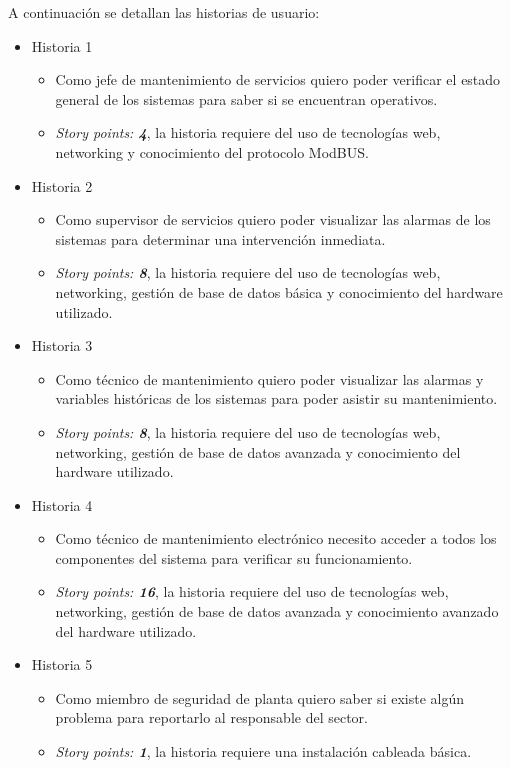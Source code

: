 \documentclass[
11pt%
]{charter}
\begin{document}
A continuación se detallan las historias de usuario:

\begin{itemize}
	\item Historia 1 
\begin{itemize}
	\item Como jefe de mantenimiento de servicios quiero poder verificar el estado general de los sistemas para saber si se encuentran operativos. 
	\item\textit{Story points: \textbf{4}}, la historia requiere del uso de tecnologías web, networking y conocimiento del protocolo ModBUS.
\end{itemize}
	\item Historia 2
\begin{itemize}
	\item Como supervisor de servicios quiero poder visualizar las alarmas de los sistemas para determinar una intervención inmediata.
	\item \textit{Story points: \textbf{8}}, la historia requiere del uso de tecnologías web, networking, gestión de base de datos básica y conocimiento del hardware utilizado.
\end{itemize}
	\item Historia 3
\begin{itemize}
	\item Como técnico de mantenimiento quiero poder visualizar las alarmas y variables históricas de los sistemas para poder asistir su mantenimiento.
	\item \textit{Story points: \textbf{8}}, la historia requiere del uso de tecnologías web, networking, gestión de base de datos avanzada y conocimiento del hardware utilizado.
\end{itemize}
	\item Historia 4
\begin{itemize}
	\item Como técnico de mantenimiento electrónico necesito acceder a todos los componentes del sistema para verificar su funcionamiento.
	\item \textit{Story points: \textbf{16}}, la historia requiere del uso de tecnologías web, networking, gestión de base de datos avanzada y conocimiento avanzado del hardware utilizado.
\end{itemize}
	\item Historia 5
\begin{itemize}
	\item Como miembro de seguridad de planta quiero saber si existe algún problema para reportarlo al responsable del sector.
	\item \textit{Story points: \textbf{1}}, la historia requiere una instalación cableada básica.
\end{itemize}

\end{itemize}
\end{document}
